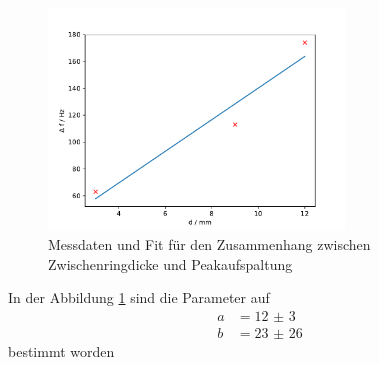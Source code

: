 \begin{figure}
    \centering
    \caption{Messdaten und Fit für den Zusammenhang zwischen Zwischenringdicke und Peakaufspaltung}
    \label{fig:Peakaufspaltung}
    \includegraphics[width=0.7\textwidth]{figure/Peak_Aufspaltung.pdf}
\end{figure}
\FloatBarrier
In der Abbildung \ref{fig:Peakaufspaltung} sind die Parameter auf 
\begin{align*}
    a&= \num{12(3)}\\
    b&= \num{23(26)}
\end{align*}
bestimmt worden
